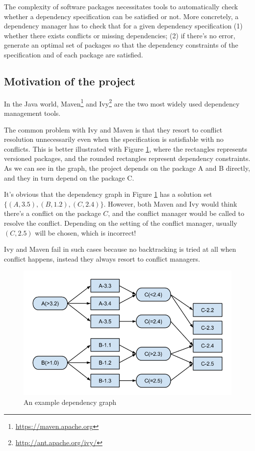 The complexity of software packages necessitates tools to automatically check whether a dependency specification can be satisfied or not. More concretely, a dependency manager has to check that for a given dependency specification (1) whether there exists conflicts or missing dependencies; (2) if there's no error, generate an optimal set of packages so that the dependency constraints of the specification and of each package are satisfied.


\subsection{Motivation of the project}

In the Java world, Maven\footnote{\url{https://maven.apache.org}} and Ivy\footnote{\url{http://ant.apache.org/ivy/}} are the two most widely used dependency management tools.

The common problem with Ivy and Maven is that they resort to conflict resolution unnecessarily even when the specification is satisfiable with no conflicts. This is better illustrated with Figure \ref{fig:introuction:underconstraint}, where the rectangles represents versioned packages, and the rounded rectangles represent dependency constraints.  As we can see in the graph, the project depends on the package A and B directly, and they in turn depend on the package C.

It's obvious that the dependency graph in Figure \ref{fig:introuction:underconstraint} has a solution set $\{(A, 3.5), (B, 1.2), (C, 2.4)\}$. However, both Maven and Ivy would think there's a conflict on the package $C$, and the conflict manager would be called to resolve the conflict. Depending on the setting of the conflict manager, usually $(C, 2.5)$ will be chosen, which is incorrect!

Ivy and Maven fail in such cases because no backtracking is tried at all when conflict happens, instead they always resort to conflict managers.

\begin{figure}[ht]
  \center
  \includegraphics[width=14cm]{img/introduction/underconstraint.png}
  \caption[An example dependency graph]{An example dependency graph \label{fig:introuction:underconstraint}}
\end{figure}

